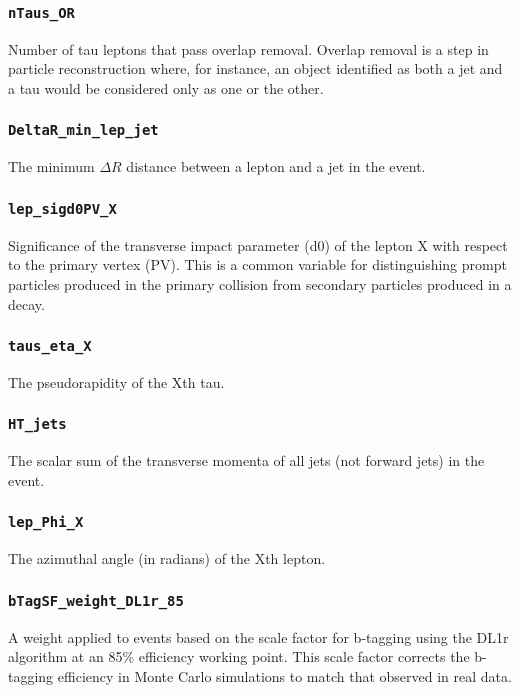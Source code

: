 \subsubsection{\texttt{nTaus\_OR}} Number of tau leptons that pass overlap removal. Overlap removal is a step in particle
reconstruction where, for instance, an object identified as both a jet and a tau would be considered only as one or the
other.

\subsubsection{\texttt{DeltaR\_min\_lep\_jet}} The minimum $\Delta R$ distance between a lepton and a jet in the event.

\subsubsection{\texttt{lep\_sigd0PV\_X}} Significance of the transverse impact parameter (d0) of the lepton X with respect
to the primary vertex (PV). This is a common variable for distinguishing prompt particles produced in the primary
collision from secondary particles produced in a decay.

\subsubsection{\texttt{taus\_eta\_X}} The pseudorapidity of the Xth tau.

\subsubsection{\texttt{HT\_jets}} The scalar sum of the transverse momenta of all jets (not forward jets) in the event.

\subsubsection{\texttt{lep\_Phi\_X}} The azimuthal angle (in radians) of the Xth lepton.

\subsubsection{\texttt{bTagSF\_weight\_DL1r\_85}} A weight applied to events based on the scale factor for b-tagging using
the DL1r algorithm at an 85\% efficiency working point. This scale factor corrects the b-tagging efficiency in Monte
Carlo simulations to match that observed in real data.

